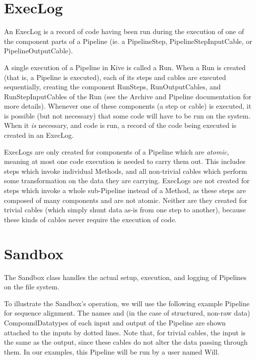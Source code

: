 \documentclass[12pt]{article}
\begin{document}
\section*{ExecLog}

An ExecLog is a record of code having been run during the execution of
one of the component parts of a Pipeline (ie. a PipelineStep,
PipelineStepInputCable, or PipelineOutputCable).

A single execution of a Pipeline in Kive is called a Run. When a Run
is created (that is, a Pipeline is executed), each of its steps and
cables are executed sequentially, creating the component RunSteps,
RunOutputCables, and RunStepInputCables of the Run (see the Archive and
Pipeline documentation for more details). Whenever one of these
components (a step or cable) is executed, it is possible (but not
necessary) that some code will have to be run on the system. When it
\emph{is} necessary, and code is run, a record of the code being
executed is created in an ExecLog. 

ExecLogs are only created for components of a Pipeline which are
\emph{atomic}, meaning at most one code execution is needed to carry
them out. This includes steps which invoke individual Methods, and all
non-trivial cables which perform some transformation on the data they
are carrying. ExecLogs are not created for steps which invoke a whole
sub-Pipeline instead of a Method, as these steps are composed of many
components and are not atomic. Neither are they created for trivial
cables (which simply shunt data as-is from one step to another), because
these kinds of cables never require the execution of code.

\section*{Sandbox}

The Sandbox class handles the actual setup, execution, and logging of Pipelines
on the file system. 

To illustrate the Sandbox's operation, we will use the following example
Pipeline for sequence alignment. The names and (in the case of structured,
non-raw data) CompoundDatatypes of each input and output of the Pipeline are
shown attached to the inputs by dotted lines. Note that, for trivial cables,
the input is the same as the output, since these cables do not alter the data
passing through them. In our examples, this Pipeline will be run by a user
named Will.
\end{document}
